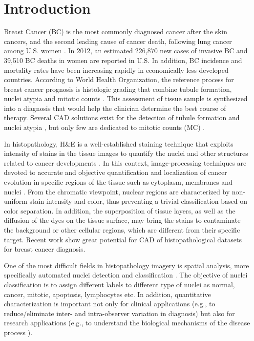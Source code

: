 \documentclass[10pt,twocolumn,letterpaper]{article}
\begin{document}
\section{Introduction}
Breast Cancer (BC) is the most commonly diagnosed cancer after the skin cancers, and the second leading cause of cancer death, following lung cancer among U.S. women \cite{jiemin2013}. In 2012, an estimated 226,870 new cases of invasive BC and 39,510 BC deaths in women are reported in U.S. In addition, BC incidence and mortality rates have been increasing rapidly in economically less developed countries. According to World Health Organization, the reference process for breast cancer prognosis is histologic grading that combine tubule formation, nuclei atypia and mitotic counts \cite{bloom1957, elston1993}. This assessment of tissue sample is synthesized into a diagnosis that would help the clinician determine the best course of therapy. Several CAD solutions exist for the detection of tubule formation \cite{petushi2006, naik2008} and nuclei atypia \cite{cosatto2008, dalle2009, chaudhury2011, dundar2011}, but only few are dedicated to mitotic counts (MC) \cite{irshad2013a, irshad2013b}.
 
In histopathology, H\&E is a well-established staining technique that exploits intensity of stains in the tissue images to quantify the nuclei and other structures related to cancer developments \cite{avwioro2011}. In this context, image-processing techniques are devoted to accurate and objective quantification and localization of cancer evolution in specific regions of the tissue such as cytoplasm, membranes and nuclei \cite{meijer1997}. From the chromatic viewpoint, nuclear regions are characterized by non-uniform stain intensity and color, thus preventing a trivial classification based on color separation. In addition, the superposition of tissue layers, as well as the diffusion of the dyes on the tissue surface, may bring the stains to contaminate the background or other cellular regions, which are different from their specific target. Recent work \cite{malon2013, irshad2013a, irshad2013b} show great potential for CAD of histopathological datasets for breast cancer diagnosis.

One of the most difficult fields in histopathology imagery is spatial analysis, more specifically automated nuclei detection and classification \cite{fuchs2011}. The objective of nuclei classification is to assign different labels to different type of nuclei as normal, cancer, mitotic, apoptosis, lymphocytes etc. In addition, quantitative characterization is important not only for clinical applications (e.g., to reduce/eliminate inter- and intra-observer variation in diagnosis) but also for research applications (e.g., to understand the biological mechanisms of the disease process \cite{gurcan2009}).
\end{document}
